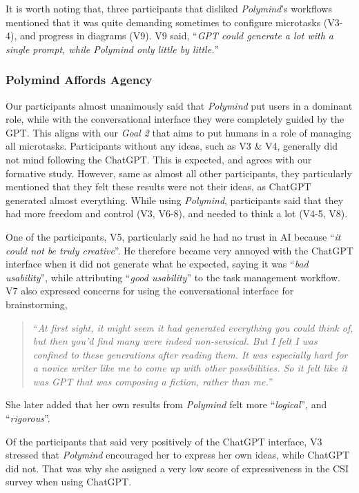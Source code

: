 It is worth noting that, three participants that disliked \textit{Polymind}'s workflows mentioned that it was quite demanding sometimes to configure microtasks (V3-4), and progress in diagrams (V9). V9 said, ``\textit{GPT could generate a lot with a single prompt, while \textit{Polymind} only little by little.}''

\subsubsection{Polymind Affords Agency}
Our participants almost unanimously said that \textit{Polymind} put users in a dominant role, while with the conversational interface they were completely guided by the GPT. This aligns with our \textit{Goal 2} that aims to put humans in a role of managing all microtasks. Participants without any ideas, such as V3 \& V4, generally did not mind following the ChatGPT. This is expected, and agrees with our formative study. However, same as almost all other participants, they particularly mentioned that they felt these results were not their ideas, as ChatGPT generated almost everything. While using \textit{Polymind}, participants said that they had more freedom and control (V3, V6-8), and needed to think a lot (V4-5, V8). 

One of the participants, V5, particularly said he had no trust in AI because ``\textit{it could not be truly creative}''. He therefore became very annoyed with the ChatGPT interface when it did not generate what he expected, saying it was ``\textit{bad usability}'', while attributing ``\textit{good usability}'' to the task management workflow. V7 also expressed concerns for using the conversational interface for brainstorming,
\begin{quote}
    ``\textit{At first sight, it might seem it had generated everything you could think of, but then you'd find many were indeed non-sensical. But I felt I was confined to these generations after reading them. It was especially hard for a novice writer like me to come up with other possibilities. So it felt like it was GPT that was composing a fiction, rather than me.}''
\end{quote}
She later added that her own results from \textit{Polymind} felt more ``\textit{logical}'', and ``\textit{rigorous}''.

Of the participants that said very positively of the ChatGPT interface, V3 stressed that \textit{Polymind} encouraged her to express her own ideas, while ChatGPT did not. That was why she assigned a very low score of expressiveness in the CSI survey when using ChatGPT.